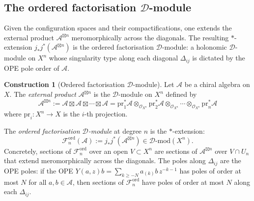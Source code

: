 \documentclass[11pt,reqno]{amsart}
\theoremstyle{definition}
\newtheorem{construction}[theorem]{Construction}
\theoremstyle{remark}
\newcommand{\cA}{\mathcal{A}}
\newcommand{\cD}{\mathcal{D}}
\newcommand{\cF}{\mathcal{F}}
\newcommand{\cO}{\mathcal{O}}
\numberwithin{equation}{section}
\begin{document}
\subsection{The ordered factorisation $\cD$-module}
\label{subsec:fact-dmod}

Given the configuration spaces and their compactifications,
one extends the external product $\cA^{\boxtimes n}$
meromorphically across the diagonals. The resulting
$*$-extension $j_* j^* (\cA^{\boxtimes n})$ is the ordered
factorisation $\cD$-module: a holonomic $\cD$-module on
$X^n$ whose singularity type along each diagonal $\Delta_{ij}$
is dictated by the OPE pole order of $\cA$.

\begin{construction}[Ordered factorisation $\cD$-module]
\label{constr:fact-dmod}
Let $\cA$ be a chiral algebra on $X$.
The \emph{external product} $\cA^{\boxtimes n}$ is the
$\cD$-module on $X^n$ defined by
\begin{equation}\label{eq:external-prod}
  \cA^{\boxtimes n}
  := \cA \boxtimes \cA \boxtimes \cdots \boxtimes \cA
  = \mathrm{pr}_1^* \cA \otimes_{\cO_{X^n}}
    \mathrm{pr}_2^* \cA \otimes_{\cO_{X^n}} \cdots
    \otimes_{\cO_{X^n}} \mathrm{pr}_n^* \cA
\end{equation}
where $\mathrm{pr}_i \colon X^n \to X$ is the
$i$-th projection.

The \emph{ordered factorisation $\cD$-module} at degree $n$
is the $*$-extension:
\begin{equation}\label{eq:fact-dmod-def}
  \cF_n^{\mathrm{ord}}(\cA)
  := j_* j^* (\cA^{\boxtimes n})
  \in \cD\text{-}\mathrm{mod}(X^n).
\end{equation}
Concretely, sections of $\cF_n^{\mathrm{ord}}$ over an
open $V \subset X^n$ are sections of $\cA^{\boxtimes n}$
over $V \cap U_n$ that extend meromorphically across the
diagonals.  The poles along $\Delta_{ij}$ are the OPE poles:
if the OPE $Y(a, z) b = \sum_{k \geq -N} a_{(k)} b \,
z^{-k-1}$ has poles of order at most $N$ for all
$a, b \in \cA$, then sections of $\cF_n^{\mathrm{ord}}$
have poles of order at most $N$ along each $\Delta_{ij}$.
\end{construction}
\end{document}
